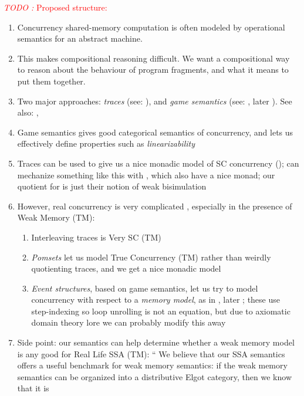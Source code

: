 \documentclass[acmsmall,screen,review]{acmart}
\newcounter{todos}
\newcommand{\TODO}[1]{{
  \stepcounter{todos}
  \begin{center}\large{\textcolor{red}{\emph{TODO \arabic{todos}:} #1}}\end{center}
}}
\begin{document}
\TODO{Proposed structure:}
\begin{enumerate}
  \item Concurrency shared-memory computation is often modeled by operational semantics for an
  abstract machine.
  \item This makes compositional reasoning difficult. We want a compositional way to reason about
  the behaviour of program fragments, and what it means to put them together.
  \item Two major approaches: \emph{traces} (see: \citet{brookes-full-abstraction-96}), and
  \emph{game semantics} (see: \citet{abramsky-algol-96}, later \citet{ghica-08}). See also:
  \citet{milner-processes-75},
  \citet{plotkin-power-76}
  \item Game semantics gives good categorical semantics of concurrency, and lets us effectively
  define properties such as \emph{linearizability} \citet{vale-linearizability-24}
  \item Traces can be used to give us a nice monadic model of SC concurrency
  (\citet{brookes-full-abstraction-96}); can mechanize something like this with
  \citet{xia-itrees-20}, which also have a nice monad; our quotient for \cite{sparky} is just their
  notion of weak bisimulation
  \item However, real concurrency is very complicated \citet{batty-compositional-17}, especially in
  the presence of Weak Memory (TM):
  \begin{enumerate}
    \item Interleaving traces is Very SC (TM)
    \item \emph{Pomsets} let us model True Concurrency (TM) rather than weirdly quotienting traces,
    and we get a nice monadic model
    \item \emph{Event structures}, based on game semantics, let us try to model concurrency with
    respect to a \emph{memory model}, as in \citet{castellan-16}, later
    \citet{paviotti-modular-relaxed-dep-20}; these use step-indexing so loop unrolling is not an
    equation, but due to axiomatic domain theory lore \citet{fiore-phd-94} we can probably modify
    this away
  \end{enumerate}
  \item Side point: our semantics can help determine whether a weak memory model is any good for
  Real Life SSA (TM): ``
  We believe that our SSA semantics offers a useful benchmark for weak memory semantics: if the weak
  memory semantics can be organized into a distributive Elgot category, then we know that it is

\end{enumerate}
\end{document}
